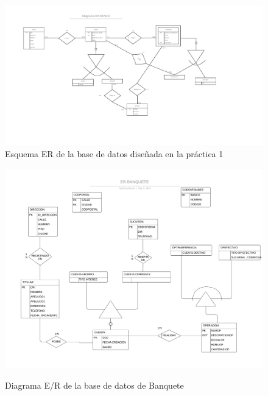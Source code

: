 \documentclass{article}
\begin{document}
\begin{landscape}
\begin{figure}
\centering
\includegraphics[scale=0.75]{images/er_practica1.png}
\caption{Esquema ER de la base de datos diseñada en la práctica 1}
\label{fig:er1}
\end{figure}
\end{landscape}


\begin{landscape}
\begin{figure}
\centering
\includegraphics[scale=0.75]{images/ER_BANQUETE.jpeg}
\label{fig:er_banquete}
\caption{Diagrama E/R de la base de datos de Banquete}
\end{figure}
\end{landscape}


\end{document}
